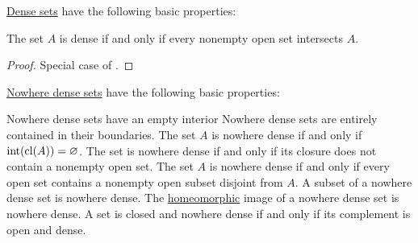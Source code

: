 \begin{proposition}\label{thm:dense_set_properties}
  \hyperref[def:topologically_dense_set/dense]{Dense sets} have the following basic properties:
  \begin{thmenum}
     The set \( A \) is dense if and only if every nonempty open set intersects \( A \).
  \end{thmenum}
\end{proposition}
\begin{proof}
   Special case of .
\end{proof}

\begin{proposition}\label{thm:nowhere_dense_properties}
  \hyperref[def:topologically_dense_set/nowhere_dense]{Nowhere dense sets} have the following basic properties:
  \begin{thmenum}
     Nowhere dense sets have an empty interior
     Nowhere dense sets are entirely contained in their boundaries.
     The set \( A \) is nowhere dense if and only if \( \operatorname{int}(\operatorname{cl}(A)) = \varnothing \).
     The set is nowhere dense if and only if its closure does not contain a nonempty open set.
    The set \( A \) is nowhere dense if and only if every open set contains a nonempty open subset disjoint from \( A \).
     A subset of a nowhere dense set is nowhere dense.
     The \hyperref[def:homeomorphism]{homeomorphic} image of a nowhere dense set is nowhere dense.
     A set is closed and nowhere dense if and only if its complement is open and dense.
  \end{thmenum}
\end{proposition}
